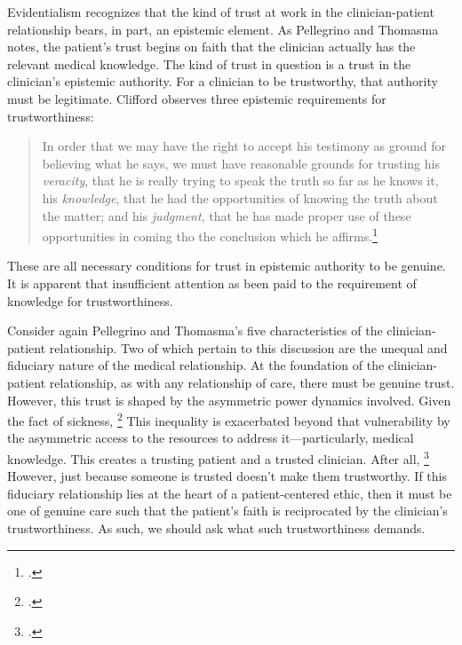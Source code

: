 \documentclass[letterpaper,notitlepage,12pt]{article}
\begin{document}
Evidentialism recognizes that the kind of trust at work in the clinician-patient
relationship bears, in part, an epistemic element.
As Pellegrino and Thomasma notes, the patient's trust begins on faith that the
clinician actually has the relevant medical knowledge.
The kind of trust in question is a trust in the clinician's epistemic authority.
For a clinician to be trustworthy, that authority must be legitimate.
Clifford observes three epistemic requirements for trustworthiness: \blockquote{In order that we may have the
  right to accept his testimony as ground for believing what he says, we must
  have reasonable grounds for trusting his \textit{veracity}, that he is really
  trying to speak the truth so far as he knows it, his \textit{knowledge}, that
  he had the opportunities of knowing the truth about the matter; and his
  \textit{judgment}, that he has made proper use of these opportunities in
coming tho the conclusion which he affirms.\footcite[p.
348]{clifford_ethics_1886}}
These are all necessary conditions for trust in epistemic authority to be
genuine.
It is apparent that insufficient attention as been paid to the requirement of
knowledge for trustworthiness.

Consider again Pellegrino and Thomasma's five characteristics of the
clinician-patient relationship.
Two of which pertain to this discussion are the unequal and fiduciary nature of
the medical relationship.
At the foundation of the clinician-patient relationship, as with any
relationship of care, there must be genuine trust.
However, this trust is shaped by the asymmetric power dynamics involved.
Given the fact of sickness, \footcite[p.
122]{pellegrino_virtues_1993}
This inequality is exacerbated beyond that vulnerability by the asymmetric
access to the resources to address it---particularly, medical knowledge.
This creates a trusting patient and a trusted clinician.
After all, \footcite[p. 68]{pellegrino_virtues_1993}
However, just because someone is trusted doesn't make them trustworthy.
If this fiduciary relationship lies at the heart of a patient-centered ethic,
then it must be one of genuine care such that the patient's faith is
reciprocated by the clinician's trustworthiness.
As such, we should ask what such trustworthiness demands.
\end{document}
